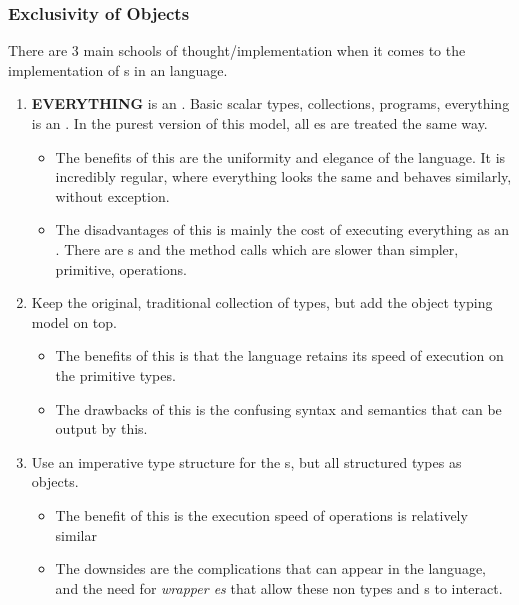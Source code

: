 \subsubsection{Exclusivity of Objects}\label{subsubsec:OOP_Object_Exclusivity}
There are 3 main schools of thought/implementation when it comes to the implementation of s in an  language.
\begin{enumerate}[noitemsep]
\item \textbf{EVERYTHING} is an . Basic scalar types, collections, programs, everything is an . In the purest version of this model, all es are treated the same way.
  \begin{itemize}[noitemsep]
  \item The benefits of this are the uniformity and elegance of the language. It is incredibly regular, where everything looks the same and behaves similarly, without exception.
  \item The disadvantages of this is mainly the cost of executing everything as an . There are s and the method calls which are slower than simpler, primitive, operations.
  \end{itemize}
\item Keep the original, traditional collection of types, but add the object typing model on top.
  \begin{itemize}[noitemsep]
  \item The benefits of this is that the language retains its speed of execution on the primitive types.
  \item The drawbacks of this is the confusing syntax and semantics that can be output by this.
  \end{itemize}
\item Use an imperative type structure for the s, but all structured types as objects.
  \begin{itemize}[noitemsep]
  \item The benefit of this is the execution speed of operations is relatively similar
  \item The downsides are the complications that can appear in the language, and the need for \emph{wrapper es} that allow these non types and s to interact.
  \end{itemize}
\end{enumerate}


